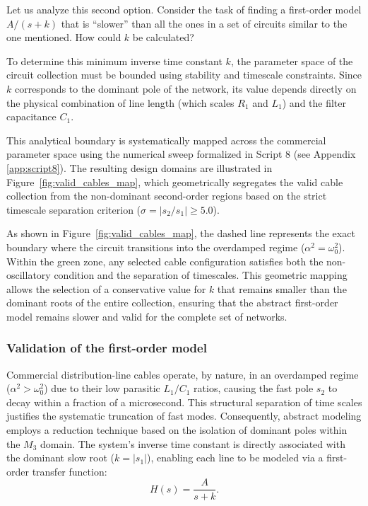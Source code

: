 \documentclass[energies,accept,oneauthor,pdftex]{Definitions/mdpi}
\begin{document}
Let us analyze this second option. Consider the task of finding a first-order model \(A/(s+k)\) that is ``slower'' than all the ones in a set of circuits similar to the one mentioned. How could $k$ be calculated?

To determine this minimum inverse time constant $k$, the parameter space of the circuit collection must be bounded using stability and timescale constraints. Since $k$ corresponds to the dominant pole of the network, its value depends directly on the physical combination of line length (which scales $R_1$ and $L_1$) and the filter capacitance $C_1$.

This analytical boundary is systematically mapped across the commercial parameter space using the numerical sweep formalized in Script 8 (see Appendix \ref{app:script8}). The resulting design domains are illustrated in Figure~\ref{fig:valid_cables_map}, which geometrically segregates the valid cable collection from the non-dominant second-order regions based on the strict timescale separation criterion ($\sigma = |s_2 / s_1| \ge 5.0$).

As shown in Figure~\ref{fig:valid_cables_map}, the dashed line represents the exact boundary where the circuit transitions into the overdamped regime ($\alpha^2 = \omega_0^2$). Within the green zone, any selected cable configuration satisfies both the non-oscillatory condition and the separation of timescales. This geometric mapping allows the selection of a conservative value for $k$ that remains smaller than the dominant roots of the entire collection, ensuring that the abstract first-order model remains slower and valid for the complete set of networks.


\subsubsection{Validation of the first-order model}
\label{subsec:first_order_reduction}


Commercial distribution-line cables operate, by nature, in an overdamped regime ($\alpha^2 > \omega_0^2$) due to their low parasitic $L_1/C_1$ ratios, causing the fast pole $s_2$ to decay within a fraction of a microsecond. This structural separation of time scales justifies the systematic truncation of fast modes. Consequently, abstract modeling employs a reduction technique based on the isolation of dominant poles within the $M_3$ domain. The system's inverse time constant is directly associated with the dominant slow root ($k = |s_1|$), enabling each line to be modeled via a first-order transfer function:
\begin{equation}
    H(s) = \frac{A}{s + k}.
\end{equation}
\end{document}
